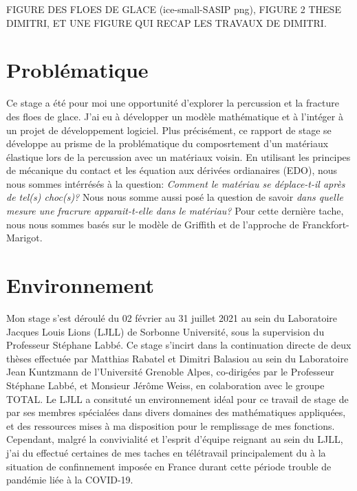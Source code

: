 FIGURE DES FLOES DE GLACE (ice-small-SASIP png), FIGURE 2 THESE DIMITRI, ET UNE FIGURE QUI RECAP LES TRAVAUX DE DIMITRI.








\section{Problématique}


Ce stage a été pour moi une opportunité d'explorer la percussion et la fracture des floes de glace. J'ai eu à développer un modèle mathématique et à l'intéger à un projet de développement logiciel. Plus précisément, ce rapport de stage se développe au prisme de la problématique du composrtement d'un matériaux élastique lors de la percussion avec un matériaux voisin. En utilisant les principes de mécanique du contact et les équation aux dérivées ordianaires (EDO), nous nous sommes intérrésés à la question: \emph{Comment le matériau se déplace-t-il après de tel(s) choc(s)?} Nous nous somme aussi posé la question de savoir \emph{dans quelle mesure une fracrure apparait-t-elle dans le matériau?} Pour cette dernière tache, nous nous sommes basés sur le modèle de Griffith et de l'approche de Franckfort-Marigot.











\section{Environnement}


Mon stage s'est déroulé du 02 février au 31 juillet 2021 au sein du Laboratoire Jacques Louis Lions (LJLL) de Sorbonne Université, sous la supervision du Professeur Stéphane Labbé. Ce stage s'incirt dans la continuation directe de deux thèses effectuée par Matthias Rabatel \Parencite{rabatel2015thesis} et Dimitri Balasiou \parencite{balasoiu2020halthesis} au sein du Laboratoire Jean Kuntzmann de l'Université Grenoble Alpes, co-dirigées par le Professeur Stéphane Labbé, et Monsieur Jérôme Weiss, en colaboration avec le groupe TOTAL. Le LJLL a consituté un environnement idéal pour ce travail de stage de par ses membres spécialées dans divers domaines des mathématiques appliquées, et des ressources mises à ma disposition pour le remplissage de mes fonctions. Cependant, malgré la convivialité et l'esprit d'équipe reignant au sein du LJLL, j'ai  du effectué certaines de mes taches en télétravail principalement du à la situation de confinnement imposée en France durant cette période trouble de pandémie liée à la COVID-19.


